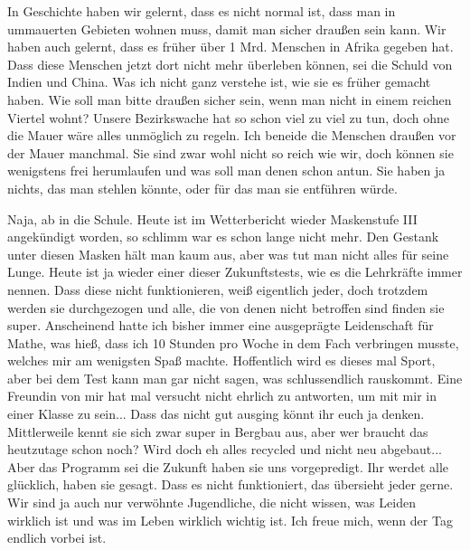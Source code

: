 \documentclass[twoside, a4paper, DIV=11, open=any, bibliography=totoc]{scrbook}
\newcommand{\Quote}[1]{\glqq #1\grqq{}}
\begin{document}
In Geschichte haben wir gelernt, dass es nicht normal ist, dass man in ummauerten
Gebieten wohnen muss, damit
man sicher draußen sein kann. Wir haben auch gelernt, dass es früher über 1 Mrd.
Menschen in Afrika gegeben hat.
Dass diese Menschen jetzt dort nicht mehr überleben können, sei die Schuld von
Indien und China.
Was ich nicht ganz
verstehe ist, wie sie es früher gemacht haben. Wie soll man bitte draußen sicher
sein, wenn man nicht in einem
reichen Viertel wohnt? Unsere Bezirkswache hat so schon viel zu viel zu tun, doch
ohne die Mauer wäre alles
unmöglich zu regeln. Ich beneide die Menschen draußen vor der Mauer manchmal.
Sie sind zwar wohl nicht so reich wie wir, doch können sie wenigstens frei
herumlaufen und was soll
man denen schon antun. Sie haben ja nichts, das man stehlen könnte, oder für das
man sie entführen würde.

Naja, ab in die Schule. 
Heute ist im Wetterbericht wieder Maskenstufe III angekündigt worden,
so schlimm war es schon lange nicht mehr. Den Gestank unter diesen Masken hält man kaum
aus, aber was tut man nicht alles für seine Lunge.
Heute ist ja wieder einer dieser \Quote{Zukunftstests}, wie es
die Lehrkräfte immer nennen.
Dass diese nicht funktionieren, weiß eigentlich jeder, doch trotzdem werden sie
durchgezogen und alle, die
von denen nicht betroffen sind finden sie super. Anscheinend hatte ich bisher immer
eine ausgeprägte Leidenschaft für Mathe, was hieß, dass ich 10 Stunden pro Woche in
dem Fach verbringen musste,
welches mir am wenigsten Spaß machte. Hoffentlich wird es dieses mal Sport, aber
bei dem Test kann man gar nicht
sagen, was schlussendlich rauskommt. Eine Freundin von mir hat mal versucht nicht
ehrlich zu antworten, um
mit mir in einer Klasse zu sein... Dass das nicht gut ausging könnt ihr euch ja
denken. Mittlerweile kennt
sie sich zwar super in Bergbau aus, aber wer braucht das heutzutage schon noch?
Wird doch eh alles recycled und
nicht neu abgebaut... Aber das Programm sei die Zukunft haben sie uns vorgepredigt.
Ihr werdet alle glücklich,
haben sie gesagt. Dass es nicht funktioniert, das übersieht jeder gerne. Wir sind
ja auch nur verwöhnte
Jugendliche, die nicht wissen, was Leiden wirklich ist und was im Leben wirklich wichtig
ist.
Ich freue mich, wenn der Tag endlich vorbei ist.

\vspace{10pt}
\end{document}
